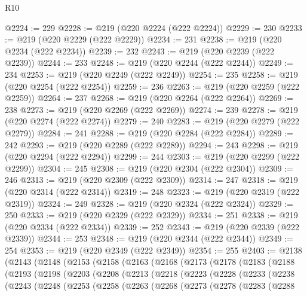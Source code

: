 \begin{lexlean}{R10}
\begin{coremodule}
@2224 := 229
@2228 := @219 (@220 @2224 (@222 @2224))
@2229 := 230
@2233 := @219 (@220 @2229 (@222 @2229))
@2234 := 231
@2238 := @219 (@220 @2234 (@222 @2234))
@2239 := 232
@2243 := @219 (@220 @2239 (@222 @2239))
@2244 := 233
@2248 := @219 (@220 @2244 (@222 @2244))
@2249 := 234
@2253 := @219 (@220 @2249 (@222 @2249))
@2254 := 235
@2258 := @219 (@220 @2254 (@222 @2254))
@2259 := 236
@2263 := @219 (@220 @2259 (@222 @2259))
@2264 := 237
@2268 := @219 (@220 @2264 (@222 @2264))
@2269 := 238
@2273 := @219 (@220 @2269 (@222 @2269))
@2274 := 239
@2278 := @219 (@220 @2274 (@222 @2274))
@2279 := 240
@2283 := @219 (@220 @2279 (@222 @2279))
@2284 := 241
@2288 := @219 (@220 @2284 (@222 @2284))
@2289 := 242
@2293 := @219 (@220 @2289 (@222 @2289))
@2294 := 243
@2298 := @219 (@220 @2294 (@222 @2294))
@2299 := 244
@2303 := @219 (@220 @2299 (@222 @2299))
@2304 := 245
@2308 := @219 (@220 @2304 (@222 @2304))
@2309 := 246
@2313 := @219 (@220 @2309 (@222 @2309))
@2314 := 247
@2318 := @219 (@220 @2314 (@222 @2314))
@2319 := 248
@2323 := @219 (@220 @2319 (@222 @2319))
@2324 := 249
@2328 := @219 (@220 @2324 (@222 @2324))
@2329 := 250
@2333 := @219 (@220 @2329 (@222 @2329))
@2334 := 251
@2338 := @219 (@220 @2334 (@222 @2334))
@2339 := 252
@2343 := @219 (@220 @2339 (@222 @2339))
@2344 := 253
@2348 := @219 (@220 @2344 (@222 @2344))
@2349 := 254
@2353 := @219 (@220 @2349 (@222 @2349))
@2354 := 255
@2403 := @2138
    (@2143
      (@2148
        (@2153
          (@2158
            (@2163
              (@2168
                (@2173
                  (@2178
                    (@2183
                      (@2188
                        (@2193
                          (@2198
                            (@2203
                              (@2208
                                (@2213
                                  (@2218
                                    (@2223
                                      (@2228
                                        (@2233
                                          (@2238
                                            (@2243
                                              (@2248
                                                (@2253
                                                  (@2258
                                                    (@2263
                                                      (@2268
                                                        (@2273
                                                          (@2278
                                                            (@2283
                                                              (@2288

\end{coremodule}
\end{lexlean}
